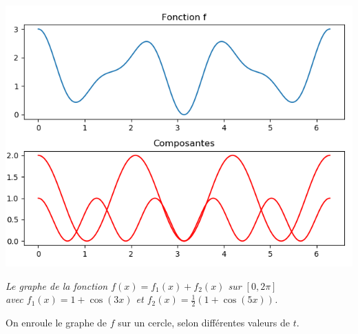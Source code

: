 \documentclass[11pt,class=report,crop=false]{standalone}
\begin{document}
\begin{center}
\includegraphics[scale=\myscale,scale=0.5]{figures/fourier-8bis}

\nopagebreak

\begin{minipage}{0.8\textwidth}
\center\emph{Le graphe de la fonction $f(x) =  f_1(x) + f_2(x)$ sur $[0,2\pi]$\\ avec $f_1(x) = 1 + \cos(3x)$ et $f_2(x) = \frac12(1+\cos(5x))$.
}
\end{minipage}
\end{center}

On enroule le graphe de $f$ sur un cercle, selon différentes valeurs de $t$.
\end{document}
